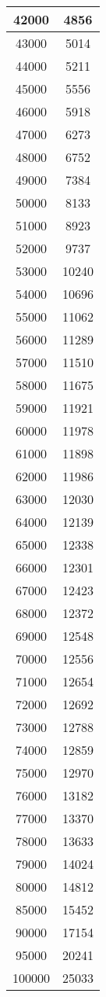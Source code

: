\documentclass[ngerman,a4paper]{report}
\begin{document}
\begin{tabular}{|c|c|}
\hline
42000 & 4856\\
\hline
43000 & 5014\\
\hline
44000 & 5211\\
\hline
45000 & 5556\\
\hline
46000 & 5918\\
\hline
47000 & 6273\\
\hline
48000 & 6752\\
\hline
49000 & 7384\\
\hline
50000 & 8133\\
\hline
51000 & 8923\\
\hline
52000 & 9737\\
\hline
53000 & 10240\\
\hline
54000 & 10696\\
\hline
55000 & 11062\\
\hline
56000 & 11289\\
\hline
57000 & 11510\\
\hline
58000 & 11675\\
\hline
59000 & 11921\\
\hline
60000 & 11978\\
\hline
61000 & 11898\\
\hline
62000 & 11986\\
\hline
63000 & 12030\\
\hline
64000 & 12139\\
\hline
65000 & 12338\\
\hline
66000 & 12301\\
\hline
67000 & 12423\\
\hline
68000 & 12372\\
\hline
69000 & 12548\\
\hline
70000 & 12556\\
\hline
71000 & 12654\\
\hline
72000 & 12692\\
\hline
73000 & 12788\\
\hline
74000 & 12859\\
\hline
75000 & 12970\\
\hline
76000 & 13182\\
\hline
77000 & 13370\\
\hline
78000 & 13633\\
\hline
79000 & 14024\\
\hline
80000 & 14812\\
\hline
85000 & 15452\\
\hline
90000 & 17154\\
\hline
95000 & 20241\\
\hline
100000 & 25033\\
\hline
\end{tabular}
\end{document}
